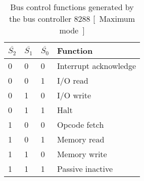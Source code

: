 \documentclass{article}
\begin{document}
\begin{table}[h!]
\centering
\begin{tabular}{ |p{1cm}|p{1cm}|p{1cm}|p{3cm}|  }
\hline
$ \overline{S_2} $ & $ \overline{S_1} $ & $ \overline{S_0} $ & Function   \\
\hline
0 & 0 & 0 & Interrupt acknowledge \\
0 & 0 & 1 & I/O read \\
0 & 1 & 0 & I/O write \\
0 & 1 & 1 & Halt \\
1 & 0 & 0 & Opcode fetch \\
1 & 0 & 1 & Memory read \\
1 & 1 & 0 & Memory write \\
1 & 1 & 1 & Passive inactive \\
\hline
\end{tabular}

\caption{Bus control functions generated by the bus controller 8288 [~Maximum mode~]}
\label{table:2}
\end{table}
\end{document}

